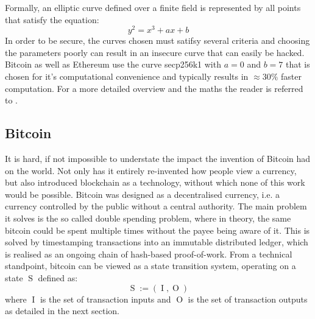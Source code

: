 \documentclass[12pt,msc,a4paper,oneside]{ucl_thesis}
\DeclareMathOperator{\Btcstate}{S}
\DeclareMathOperator{\Btcinput}{I}
\DeclareMathOperator{\Btcoutput}{O}
\begin{document}
Formally, an elliptic curve defined over a finite field is represented by all points that satisfy the equation:
\begin{equation}
    y^2 = x^3 + ax + b
\end{equation}
In order to be secure, the curves chosen must satifsy several criteria and choosing the parameters poorly can result in an insecure curve that can easily be hacked. Bitcoin as well as Ethereum use the curve secp256k1 with $a = 0$ and $b = 7$ that is chosen for it's computational convenience and typically results in $\approx 30\%$ faster computation. For a more detailed overview and the maths the reader is referred to \cite{smart2003cryptography}.

\subsection{Bitcoin} \label{sec:background_bitcoin}
It is hard, if not impossible to understate the impact the invention of Bitcoin had on the world. Not only has it entirely re-invented how people view a currency, but also introduced blockchain as a technology, without which none of this work would be possible. Bitcoin was designed as a decentralised currency, i.e. a currency controlled by the public without a central authority. The main problem it solves is the so called double spending problem, where in theory, the same bitcoin could be spent multiple times without the payee being aware of it. This is solved by timestamping transactions into an immutable distributed ledger, which is realised as an ongoing chain of hash-based proof-of-work. From a technical standpoint, bitcoin can be viewed as a state transition system, operating on a state $\Btcstate$ defined as:
\begin{equation}
    \Btcstate := (\Btcinput, \Btcoutput)
\end{equation}
where $\Btcinput$ is the set of transaction inputs and $\Btcoutput$ is the set of transaction outputs as detailed in the next section.
\end{document}
